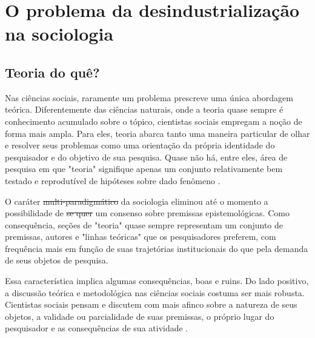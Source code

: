 \chapter{O problema da desindustrialização na sociologia}

\section{Teoria do quê?}

Nas ciências sociais, raramente um problema prescreve uma única abordagem teórica. Diferentemente das ciências naturais, onde a teoria quase sempre é conhecimento acumulado sobre o tópico, cientistas sociais empregam a noção de forma mais ampla. Para eles, teoria abarca tanto uma maneira particular de olhar e resolver seus problemas como uma orientação da própria identidade do pesquisador e do objetivo de sua pesquisa. Quase não há, entre eles, área de pesquisa em que "teoria" signifique apenas
um conjunto relativamente bem testado e reprodutível de hipóteses sobre dado
fenômeno . 

O caráter \sout{multi-paradigmático} da sociologia  eliminou até o momento
a possibilidade de \sout{se quer} um consenso sobre premissas epistemológicas.
Como consequência, seções de "teoria" quase sempre representam
um conjunto de premissas, autores e "linhas teóricas" que os pesquisadores preferem, com frequência mais em função de suas trajetórias institucionais do que pela demanda de seus objetos de pesquisa. 


Essa característica implica algumas consequências, boas e ruins. Do lado positivo, a discussão teórica e metodológica nas ciências sociais costuma ser mais robusta. Cientistas sociais pensam e discutem com mais
afinco sobre a natureza de seus objetos, a validade ou parcialidade de suas premissas,
o próprio lugar do pesquisador e as consequências de sua atividade .


